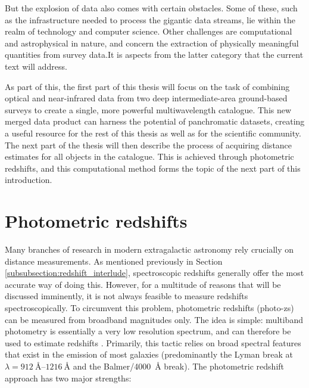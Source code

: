 But the explosion of data also comes with certain obstacles. Some of these, such as the infrastructure needed to process the gigantic data streams, lie within the realm of technology and computer science. Other challenges are computational and astrophysical in nature, and concern the extraction of physically meaningful quantities from survey data.It is aspects from the latter category that the current text will address. \par


%



As part of this, the first part of this thesis will focus on the task of combining optical and near-infrared data from two deep intermediate-area ground-based surveys to create a single, more powerful multiwavelength catalogue. This new merged data product can harness the potential of panchromatic datasets, creating a useful resource for the rest of this thesis as well as for the scientific community. The next part of the thesis will then describe the process of acquiring distance estimates for all objects in the catalogue. This is achieved through photometric redshifts, and this computational method forms the topic of the next part of this introduction.  \par




\section{Photometric redshifts}\label{section:photometric_redshifts}
Many branches of research in modern extragalactic astronomy rely crucially on distance measurements. As mentioned previously in Section \ref{subsubsection:redshift_interlude}, spectroscopic redshifts generally offer the most accurate way of doing this. However, for a multitude of reasons that will be discussed imminently, it is not always feasible to measure redshifts spectroscopically. To circumvent this problem, photometric redshifts (photo-zs) can be measured from broadband magnitudes only. The idea is simple: multiband photometry is essentially a very low resolution spectrum, and can therefore be used to estimate redshifts \citep{1998astro.ph..9347Y}. Primarily, this tactic relies on broad spectral features that exist in the emission of most galaxies (predominantly the Lyman break at $\lambda = \SIrange{912}{1216}{\angstrom}$ and the Balmer/\SI{4000}{\angstrom} break). The photometric redshift approach has two major strengths: 

